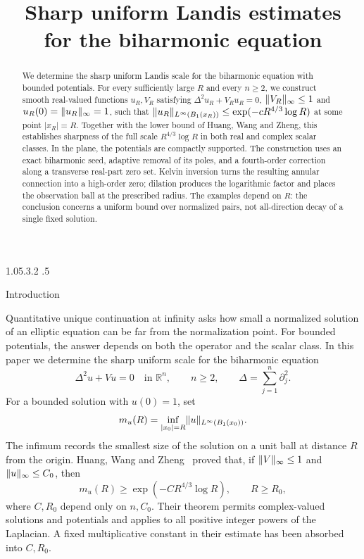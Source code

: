\documentclass[11pt,a4paper,leqno]{amsart}
\title[Sharp uniform biharmonic Landis estimates]
{Sharp uniform Landis estimates\\
for the biharmonic equation}
\date{}
\makeatletter
\numberwithin{equation}{section}
\theoremstyle{landisplain}
\theoremstyle{landisdefinition}
\theoremstyle{landisremark}
\newcommand{\R}{\mathbb R}
\newcommand{\pa}{\partial}
\DeclarePairedDelimiter{\norm}{\lVert}{\rVert}
\renewcommand\section{\Needspace{7\baselineskip}\@startsection{section}{1}{\z@}%
  {1.05\baselineskip \@plus .3\baselineskip \@minus .2\baselineskip}%
  {.5\baselineskip}%
  {\normalfont\large\bfseries\raggedright}}
\makeatother
\begin{document}
\begin{abstract}
We determine the sharp uniform Landis scale for the biharmonic
equation with bounded potentials. For every sufficiently large
$R$ and every $n\ge2$, we construct smooth real-valued functions
$u_R,V_R$ satisfying $\Delta^2u_R+V_Ru_R=0$,
$\norm{V_R}_\infty\le1$ and
$u_R(0)=\norm{u_R}_\infty=1$, such that
$\norm{u_R}_{L^\infty(B_1(x_R))}
\le\exp(-cR^{4/3}\log R)$ at some point $|x_R|=R$.
Together with the lower bound of Huang, Wang and Zheng, this
establishes sharpness of the full scale $R^{4/3}\log R$ in
both real and complex scalar classes. In the plane, the potentials
are compactly supported. The construction uses an exact
biharmonic seed, adaptive removal of its poles, and a fourth-order
correction along a transverse real-part zero set. Kelvin inversion
turns the resulting annular connection into a high-order zero;
dilation produces the logarithmic factor and places the observation
ball at the prescribed radius. The examples depend on $R$:
the conclusion concerns a uniform bound over normalized pairs,
not all-direction decay of a single fixed solution.
\end{abstract}
\maketitle
\begingroup
\small
\tableofcontents
\endgroup

\section{Introduction}
\label{sec:introduction}

Quantitative unique continuation at infinity asks how small a
normalized solution of an elliptic equation can be far from the
normalization point. For bounded potentials, the answer depends on
both the operator and the scalar class. In this paper we determine
the sharp uniform scale for the biharmonic equation
\begin{equation}\label{eq:equation}
 \Delta^2u+Vu=0\quad\text{in }\R^n,\qquad n\ge2,
 \qquad \Delta=\sum_{j=1}^n\pa_j^2.
\end{equation}
For a bounded solution with $u(0)=1$, set
\begin{equation}\label{eq:mass}
 m_u(R)=\inf_{|x_0|=R}\norm{u}_{L^\infty(B_1(x_0))}.
\end{equation}
The infimum records the smallest size of the solution on a unit
ball at distance $R$ from the origin. Huang, Wang and
Zheng~\cite[Theorem~1.1]{HWZ} proved that, if
$\norm V_\infty\le1$ and $\norm u_\infty\le C_0$, then
\begin{equation}\label{eq:known-bound}
 m_u(R)\ge\exp(-CR^{4/3}\log R),\qquad R\ge R_0,
\end{equation}
where $C,R_0$ depend only on $n,C_0$. Their theorem permits
complex-valued solutions and potentials and applies to all positive
integer powers of the Laplacian. A fixed multiplicative constant
in their estimate has been absorbed into $C,R_0$.
\end{document}
